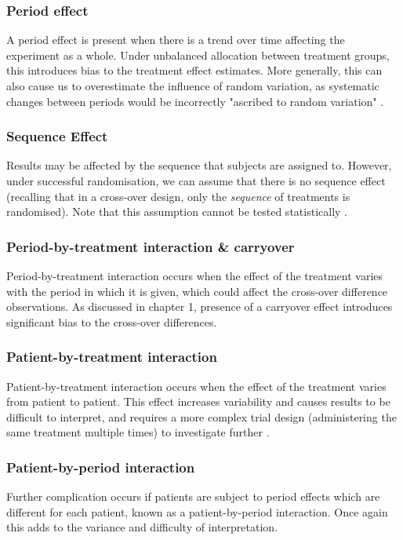 \documentclass[12pt, TexShade, letterpaper]{report}
\begin{document}
\subsubsection{Period effect}
A period effect is present when there is a trend over time affecting the experiment as a whole. Under unbalanced allocation between treatment groups, this introduces bias to the treatment effect estimates. More generally, this can also cause us to overestimate the influence of random variation, as systematic changes between periods would be incorrectly "ascribed to random variation" \cite{senn2002crossover}.

\subsubsection{Sequence Effect}
Results may be affected by the sequence that subjects are assigned to. However, under successful randomisation, we can assume that there is no sequence effect \cite{lim2021considerations} (recalling that in a cross-over design, only the \textit{sequence} of treatments is randomised). Note that this assumption cannot be tested statistically \cite{lim2021considerations}.

\subsubsection{Period-by-treatment interaction \& carryover}
Period-by-treatment interaction occurs when the effect of the treatment varies with the period in which it is given, which could affect the cross-over difference observations. As discussed in chapter 1, presence of a carryover effect introduces significant bias to the cross-over differences.

\subsubsection{Patient-by-treatment interaction}
Patient-by-treatment interaction occurs when the effect of the treatment varies from patient to patient. This effect increases variability and causes results to be difficult to interpret, and requires a more complex trial design (administering the same treatment multiple times) to investigate further \cite{senn2002crossover}.

\subsubsection{Patient-by-period interaction}
Further complication occurs if patients are subject to period effects which are different for each patient, known as a patient-by-period interaction. Once again this adds to the variance and difficulty of interpretation.
\end{document}

